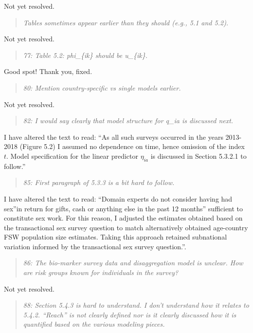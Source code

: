 \documentclass[
  12pt,
]{article}
\begin{document}
Not yet resolved.

\begin{quote}
\emph{Tables sometimes appear earlier than they should (e.g., 5.1 and
5.2).}
\end{quote}

Not yet resolved.

\begin{quote}
\emph{77: Table 5.2: phi\_\{ik\} should be u\_\{ik\}.}
\end{quote}

Good spot! Thank you, fixed.

\begin{quote}
\emph{80: Mention country-specific vs single models earlier.}
\end{quote}

Not yet resolved.

\begin{quote}
\emph{82: I would say clearly that model structure for q\_ia is
discussed next.}
\end{quote}

I have altered the text to read: ``As all such surveys occurred in the
years 2013-2018 (Figure 5.2) I assumed no dependence on time, hence
omission of the index \(t\). Model specification for the linear
predictor \(\eta_{ia}\) is discussed in Section 5.3.2.1 to follow.''

\begin{quote}
\emph{85: First paragraph of 5.3.3 is a bit hard to follow.}
\end{quote}

I have altered the text to read: ``Domain experts do not consider having
had sex''in return for gifts, cash or anything else in the past 12
months'' sufficient to constitute sex work. For this reason, I adjusted
the estimates obtained based on the transactional sex survey question to
match alternatively obtained age-country FSW population size estimates.
Taking this approach retained subnational variation informed by the
transactional sex survey question.''.

\begin{quote}
\emph{86: The bio-marker survey data and disaggregation model is
unclear. How are risk groups known for individuals in the survey?}
\end{quote}

Not yet resolved.

\begin{quote}
\emph{88: Section 5.4.3 is hard to understand. I don't understand how it
relates to 5.4.2. ``Reach'' is not clearly defined nor is it clearly
discussed how it is quantified based on the various modeling pieces.}
\end{quote}
\end{document}
